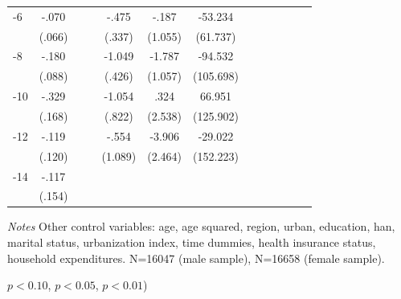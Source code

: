 \begin{table}[!ht]
\begin{adjustbox}{max width=\linewidth}
\begin{threeparttable}
{\begin{tabular}{l*{6}{S
S}}
-6             &    -.070         &         &         &    -.475         &    -.187         &  -53.234         \\
                &   (.066)         &         &         &   (.337)         &  (1.055)         & (61.737)         \\
-8             &    -.180\sym{**} &         &         &   -1.049\sym{**} &   -1.787\sym{*}  &  -94.532         \\
                &   (.088)         &         &         &   (.426)         &  (1.057)         &(105.698)         \\
-10            &    -.329\sym{*}  &         &         &   -1.054         &     .324         &   66.951         \\
                &   (.168)         &         &         &   (.822)         &  (2.538)         &(125.902)         \\
-12           &    -.119         &         &         &    -.554         &   -3.906         &  -29.022         \\
                &   (.120)         &         &         &  (1.089)         &  (2.464)         &(152.223)         \\
-14           &    -.117         &         &         &                  &                  &                  \\
                &   (.154)         &         &         &                  &                  &                  \\
\bottomrule
\end{tabular}
\begin{tablenotes}
\item \textit{Notes} Other control variables: age, age squared, region, urban, education, han, marital status, urbanization index, time dummies, health insurance status, household expenditures. N=16047 (male sample), N=16658 (female sample).
\item \sym{*} \(p<0.10\), \sym{**} \(p<0.05\), \sym{***} \(p<0.01\))
\end{tablenotes}
}
\end{threeparttable}
\end{adjustbox}
\end{table}


